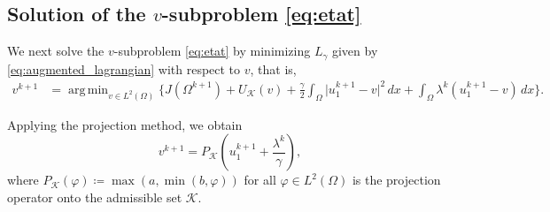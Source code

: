 \documentclass[a4paper,11pt]{article}
\DeclareMathOperator*{\argmin}{arg\,min}
\newcommand{\ur}{u_{1}}
\newcommand{\intO}[1]{\int_{\varOmega}{#1}{\, {d}{x}}}
\newcommand{\ADMMpara}{\gamma}
\begin{document}
%
%
%
%
%
\subsection{Solution of the $v$-subproblem \eqref{eq:etat}}
We next solve the $v$-subproblem \eqref{eq:etat} by minimizing ${L}_{\ADMMpara}$ given by \eqref{eq:augmented_lagrangian} with respect to $v$, that is,
\begin{align*}
v^{k+1} 
&= \argmin_{v \in L^{2}({\varOmega})}
\Big\{ J(\varOmega^{k+1})+U_{\mathcal{K}}(v)
+ \frac{\ADMMpara}{2}  \intO{\vert {\ur^{k+1}}-v \vert^2} 
+ \intO{\lambda^{k}  ( {\ur^{k+1}}-v )} 
\Big\}.
%
\end{align*}



Applying the projection method, we obtain
\begin{equation}\label{eq:projection_formula}
	v^{k+1} = P_{\mathcal{K}}\left({\ur^{k+1}} + \dfrac{\lambda^{k}}{\ADMMpara} \right),
\end{equation}
where $P_{\mathcal{K}}(\varphi) \coloneqq \max(a, \min(b, \varphi))$ for all $\varphi \in L^{2}({\varOmega})$ is the projection operator onto the admissible set $\mathcal{K}$.
\end{document}
